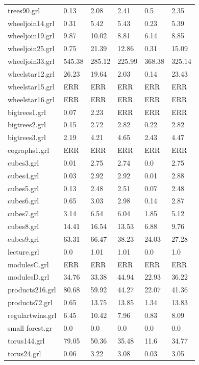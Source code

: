 \documentclass[11pt]{article}
\begin{document}
\begin{table}[h!]
\begin{tabularx}{\textwidth}{|l|X|X|X|X|X|}
		trees90.grl & 0.13 & 2.08 & 2.41 & 0.5 & 2.35 \\
		wheeljoin14.grl & 0.31 & 5.42 & 5.43 & 0.23 & 5.39 \\
		wheeljoin19.grl & 9.87 & 10.02 & 8.81 & 6.14 & 8.85 \\
		wheeljoin25.grl & 0.75 & 21.39 & 12.86 & 0.31 & 15.09 \\
		wheeljoin33.grl & 545.38 & 285.12 & 225.99 & 368.38 & 325.14 \\
		wheelstar12.grl & 26.23 & 19.64 & 2.03 & 0.14 & 23.43 \\
		wheelstar15.grl & ERR & ERR & ERR & ERR & ERR \\
		wheelstar16.grl & ERR & ERR & ERR & ERR & ERR \\
		bigtrees1.grl & 0.07 & 2.23 & ERR & ERR & ERR \\
		bigtrees2.grl & 0.15 & 2.72 & 2.82 & 0.22 & 2.82 \\
		bigtrees3.grl & 2.19 & 4.21 & 4.65 & 2.43 & 4.47 \\
		cographs1.grl & ERR & ERR & ERR & ERR & ERR \\
		cubes3.grl & 0.01 & 2.75 & 2.74 & 0.0 & 2.75 \\
		cubes4.grl & 0.03 & 2.92 & 2.92 & 0.01 & 2.88 \\
		cubes5.grl & 0.13 & 2.48 & 2.51 & 0.07 & 2.48 \\
		cubes6.grl & 0.65 & 3.03 & 2.98 & 0.14 & 2.87 \\
		cubes7.grl & 3.14 & 6.54 & 6.04 & 1.85 & 5.12 \\
		cubes8.grl & 14.41 & 16.54 & 13.53 & 6.88 & 9.76 \\
		cubes9.grl & 63.31 & 66.47 & 38.23 & 24.03 & 27.28 \\
		lecture.grl & 0.0 & 1.01 & 1.01 & 0.0 & 1.0 \\
		modulesC.grl & ERR & ERR & ERR & ERR & ERR \\
		modulesD.grl & 34.76 & 33.38 & 44.94 & 22.93 & 36.22 \\
		products216.grl & 80.68 & 59.92 & 44.27 & 22.07 & 41.36 \\
		products72.grl & 0.65 & 13.75 & 13.85 & 1.34 & 13.83 \\
		regulartwins.grl & 6.45 & 10.42 & 7.96 & 0.83 & 8.09 \\
		small forest.gr & 0.0 & 0.0 & 0.0 & 0.0 & 0.0 \\
		torus144.grl & 79.05 & 50.36 & 35.48 & 11.6 & 34.77 \\
		torus24.grl & 0.06 & 3.22 & 3.08 & 0.03 & 3.05 \\

\end{tabularx}
\end{table}
\end{document}
